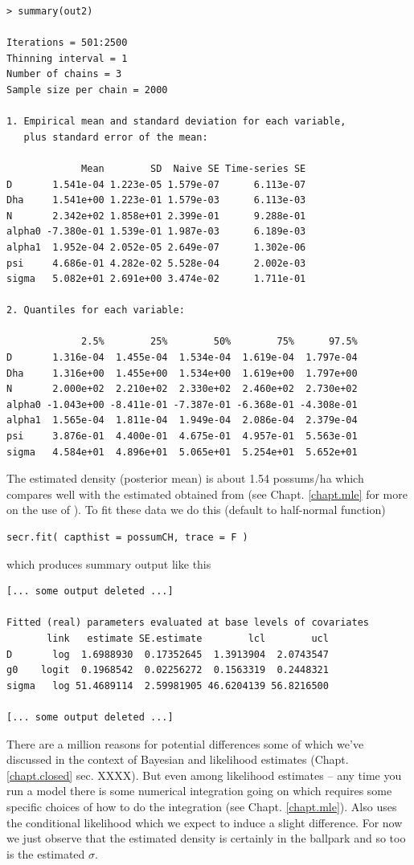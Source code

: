 {\small
\begin{verbatim}
> summary(out2)

Iterations = 501:2500
Thinning interval = 1
Number of chains = 3
Sample size per chain = 2000

1. Empirical mean and standard deviation for each variable,
   plus standard error of the mean:

             Mean        SD  Naive SE Time-series SE
D       1.541e-04 1.223e-05 1.579e-07      6.113e-07
Dha     1.541e+00 1.223e-01 1.579e-03      6.113e-03
N       2.342e+02 1.858e+01 2.399e-01      9.288e-01
alpha0 -7.380e-01 1.539e-01 1.987e-03      6.189e-03
alpha1  1.952e-04 2.052e-05 2.649e-07      1.302e-06
psi     4.686e-01 4.282e-02 5.528e-04      2.002e-03
sigma   5.082e+01 2.691e+00 3.474e-02      1.711e-01

2. Quantiles for each variable:

             2.5%        25%        50%        75%      97.5%
D       1.316e-04  1.455e-04  1.534e-04  1.619e-04  1.797e-04
Dha     1.316e+00  1.455e+00  1.534e+00  1.619e+00  1.797e+00
N       2.000e+02  2.210e+02  2.330e+02  2.460e+02  2.730e+02
alpha0 -1.043e+00 -8.411e-01 -7.387e-01 -6.368e-01 -4.308e-01
alpha1  1.565e-04  1.811e-04  1.949e-04  2.086e-04  2.379e-04
psi     3.876e-01  4.400e-01  4.675e-01  4.957e-01  5.563e-01
sigma   4.584e+01  4.896e+01  5.065e+01  5.254e+01  5.652e+01
\end{verbatim}
}

The estimated density (posterior mean) is about 1.54 possums/ha which
compares well with the estimated obtained from \secr (see
Chapt. \ref{chapt.mle} for more on the use of \secr).
To fit these data we do this (default to half-normal function)
\begin{verbatim}
secr.fit( capthist = possumCH, trace = F )
\end{verbatim}
which produces summary output like this
\begin{verbatim}
[... some output deleted ...]

Fitted (real) parameters evaluated at base levels of covariates
       link   estimate SE.estimate        lcl        ucl
D       log  1.6988930  0.17352645  1.3913904  2.0743547
g0    logit  0.1968542  0.02256272  0.1563319  0.2448321
sigma   log 51.4689114  2.59981905 46.6204139 56.8216500

[... some output deleted ...]
\end{verbatim}
There are a million reasons for potential differences some of which
we've discussed in the context of Bayesian and likelihood estimates
(Chapt. \ref{chapt.closed} sec. XXXX).
But even among likelihood estimates -- any time you run a model there
is some numerical integration going on which requires some specific
choices of how to do the integration (see
Chapt. \ref{chapt.mle}). Also \secr uses the conditional likelihood
\citep{borchers_efford:2008} which we expect to induce a slight
difference.
For now we just observe that the estimated density is certainly in the
ballpark and so too is the estimated $\sigma$.


